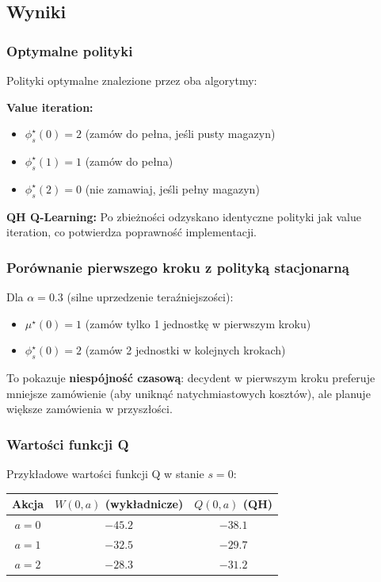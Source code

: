 \subsection{Wyniki}

\subsubsection{Optymalne polityki}

Polityki optymalne znalezione przez oba algorytmy:

\textbf{Value iteration:}
\begin{itemize}
\item $\phi_s^\star(0) = 2$ (zamów do pełna, jeśli pusty magazyn)
\item $\phi_s^\star(1) = 1$ (zamów do pełna)
\item $\phi_s^\star(2) = 0$ (nie zamawiaj, jeśli pełny magazyn)
\end{itemize}

\textbf{QH Q-Learning:}
Po zbieżności odzyskano identyczne polityki jak value iteration, co potwierdza poprawność implementacji.

\subsubsection{Porównanie pierwszego kroku z polityką stacjonarną}

Dla $\alpha = 0.3$ (silne uprzedzenie teraźniejszości):

\begin{itemize}
\item $\mu^\star(0) = 1$ (zamów tylko 1 jednostkę w pierwszym kroku)
\item $\phi_s^\star(0) = 2$ (zamów 2 jednostki w kolejnych krokach)
\end{itemize}

To pokazuje \textbf{niespójność czasową}: decydent w pierwszym kroku preferuje mniejsze zamówienie (aby uniknąć natychmiastowych kosztów), ale planuje większe zamówienia w przyszłości.

\subsubsection{Wartości funkcji Q}

Przykładowe wartości funkcji Q w stanie $s = 0$:

\begin{center}
\begin{tabular}{|c|c|c|}
\hline
Akcja & $W(0, a)$ (wykładnicze) & $Q(0, a)$ (QH) \\
\hline
$a = 0$ & $-45.2$ & $-38.1$ \\
$a = 1$ & $-32.5$ & $-29.7$ \\
$a = 2$ & $-28.3$ & $-31.2$ \\
\hline
\end{tabular}
\end{center}

